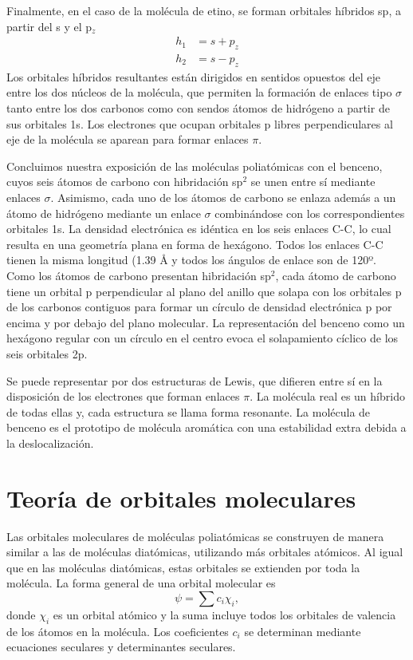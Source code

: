 \documentclass{tufte-handout}
\begin{document}
Finalmente, en el caso de la molécula de etino, se forman
orbitales híbridos sp, a partir del s y el p$_z$
\begin{align*}
    h_1&=s+p_z\\
    h_2&=s-p_z
\end{align*}
Los orbitales híbridos resultantes están dirigidos en sentidos
opuestos del eje entre los dos núcleos de la molécula, que
permiten la formación de enlaces tipo $\sigma$ tanto entre
los dos carbonos como con sendos átomos de hidrógeno
a partir de sus orbitales 1s. Los electrones que ocupan orbitales
p libres perpendiculares al eje de la molécula se aparean
para formar enlaces $\pi$.

Concluimos nuestra exposición de las moléculas poliatómicas
con el benceno, cuyos seis átomos de carbono con hibridación 
sp$^2$ se unen entre sí mediante enlaces $\sigma$. Asimismo,
cada uno de los átomos de carbono se enlaza además a un átomo 
de hidrógeno mediante un enlace $\sigma$ combinándose con los
correspondientes orbitales 1s. La densidad electrónica es 
idéntica en los seis enlaces C-C, lo cual resulta en una geometría
plana en forma de hexágono. Todos los enlaces C-C tienen la 
misma longitud (1.39 {\AA} y todos los ángulos de enlace 
son de 120º. Como los átomos de carbono presentan hibridación
sp$^2$, cada átomo de carbono tiene un orbital p perpendicular
al plano del anillo que solapa con los orbitales p de los 
carbonos contiguos para formar un círculo de densidad electrónica 
p por encima y por debajo del plano molecular.
La representación del benceno como un hexágono regular con un 
círculo en el centro evoca el solapamiento cíclico de los seis
orbitales 2p.

Se puede representar por dos estructuras de Lewis, que difieren 
entre sí en la disposición de los electrones que forman enlaces 
$\pi$. La molécula real es un híbrido de todas ellas y, cada
estructura se llama forma resonante. La molécula de benceno es 
el prototipo de molécula aromática con una estabilidad extra 
debida a la deslocalización.

\section{Teoría de orbitales moleculares}
Las orbitales moleculares de moléculas poliatómicas se 
construyen de manera similar a las de moléculas diatómicas,
utilizando más orbitales atómicos. Al igual que en las moléculas
diatómicas, estas orbitales se extienden por toda la molécula. 
La forma general de una orbital molecular es
\begin{equation}
\psi=\sum c_i\chi_i,
\end{equation}
donde $\chi_i$ es un orbital atómico y la suma incluye todos
los orbitales de valencia de los átomos en la molécula.
Los coeficientes $c_i$ se determinan mediante ecuaciones 
seculares y determinantes seculares. 
\end{document}
